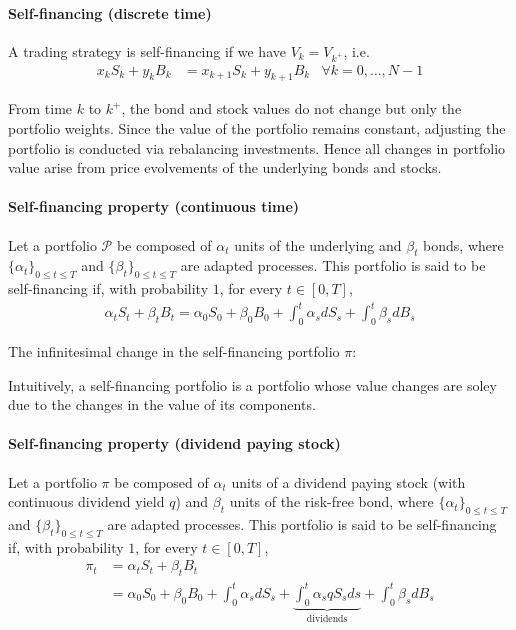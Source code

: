\documentclass[a4paper,landscape,7pt,fleqn]{scrartcl}
\newcommand*\widefbox[1]{\fbox{\hspace{2em}#1\hspace{2em}}}		%
\begin{document}
\begin{multicols*}{3}
\paragraph{Self-financing (discrete time)}
A trading strategy is self-financing if we have $V_k = V_{k^+}$, i.e.
\begin{align*}
x_k S_k + y_k B_k &= x_{k+1} S_k + y_{k+1} B_k & \forall k = 0, \ldots, N-1
\end{align*}

From time $k$ to $k^+$, the bond and stock values do not change but only the portfolio weights. Since the value of the portfolio remains constant, adjusting the portfolio is conducted via rebalancing investments. Hence all changes in portfolio value arise from price evolvements of the underlying bonds and stocks.

\paragraph{Self-financing property (continuous time)}
Let a portfolio $\mathcal{P}$ be composed of $\alpha_t$ units of the underlying and $\beta_t$ bonds, where $\{ \alpha_t \}_{0 \leq t \leq T}$ and $\{ \beta_t \}_{0 \leq t \leq T}$ are adapted processes. This portfolio is said to be self-financing if, with probability $1$, for every $t \in [0,T]$,
\begin{align*}
\alpha_t S_t + \beta_t B_t = \alpha_0 S_0 + \beta_0 B_0 + \int_0^t \alpha_s dS_s + \int_0^t \beta_s dB_s
\end{align*}

The infinitesimal change in the self-financing portfolio $\pi$:

Intuitively, a self-financing portfolio is a portfolio whose value changes are soley due to the changes in the value of its components.

\paragraph{Self-financing property (dividend paying stock)}
Let a portfolio $\pi$ be composed of $\alpha_t$ units of a dividend paying stock (with continuous dividend yield $q$) and $\beta_t$ units of the risk-free bond, where $\{ \alpha_t \}_{0 \leq t \leq T}$ and $\{ \beta_t \}_{0 \leq t \leq T}$ are adapted processes. This portfolio is said to be self-financing if, with probability $1$, for every $t \in [0,T]$,
\begin{align*}
\pi_t &= \alpha_t S_t + \beta_t B_t \\
&= \alpha_0 S_0 + \beta_0 B_0 + \int_0^t \alpha_s dS_s + \underbrace{\int_0^t \alpha_s q S_s ds}_\text{dividends} + \int_0^t \beta_s dB_s
\end{align*}


\end{multicols*}
\end{document}
